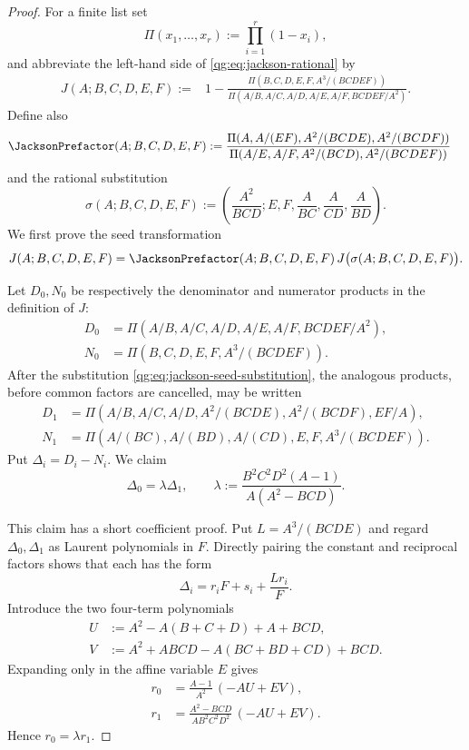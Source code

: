 \begin{proof}
For a finite list set
\[
 \Pi(x_1,\ldots,x_r):=\prod_{i=1}^{r}(1-x_i),
\]
and abbreviate the left-hand side of
\eqref{qg:eq:jackson-rational} by
\begin{align*}
J(A;B,C,D,E,F)
:={}&1-
\frac{\Pi(B,C,D,E,F,A^3/(BCDEF))}
{\Pi(A/B,A/C,A/D,A/E,A/F,BCDEF/A^2)}.
\end{align*}
Define also
\begin{align*}
\JacksonPrefactor(A;B,C,D,E,F)
:={}&
\frac{\Pi(A,A/(EF),A^2/(BCDE),A^2/(BCDF))}
{\Pi(A/E,A/F,A^2/(BCD),A^2/(BCDEF))}
\end{align*}
and the rational substitution
\begin{equation}
\label{qg:eq:jackson-seed-substitution}
\sigma(A;B,C,D,E,F)
:=\left(
 \frac{A^2}{BCD};
 E,F,\frac{A}{BC},\frac{A}{CD},\frac{A}{BD}
\right).
\end{equation}
We first prove the seed transformation
\begin{equation}
\label{qg:eq:jackson-seed}
 J(A;B,C,D,E,F)
 =\JacksonPrefactor(A;B,C,D,E,F)\,
  J\bigl(\sigma(A;B,C,D,E,F)\bigr).
\end{equation}

Let $D_0,N_0$ be respectively the denominator and numerator products in the
definition of $J$:
\begin{align*}
D_0&=\Pi(A/B,A/C,A/D,A/E,A/F,BCDEF/A^2),\\
N_0&=\Pi(B,C,D,E,F,A^3/(BCDEF)).
\end{align*}
After the substitution \eqref{qg:eq:jackson-seed-substitution}, the analogous
products, before common factors are cancelled, may be written
\begin{align*}
D_1&=\Pi(A/B,A/C,A/D,A^2/(BCDE),A^2/(BCDF),EF/A),\\
N_1&=\Pi(A/(BC),A/(BD),A/(CD),E,F,A^3/(BCDEF)).
\end{align*}
Put $\Delta_i=D_i-N_i$.  We claim
\begin{equation}
\label{qg:eq:jackson-delta-transform}
 \Delta_0=\lambda\Delta_1,
 \qquad
 \lambda:=\frac{B^2C^2D^2(A-1)}{A(A^2-BCD)}.
\end{equation}

This claim has a short coefficient proof.  Put $L=A^3/(BCDE)$ and regard
$\Delta_0,\Delta_1$ as Laurent polynomials in $F$.  Directly pairing the
constant and reciprocal factors shows that each has the form
\[
 \Delta_i=r_iF+s_i+\frac{Lr_i}{F}.
\]
Introduce the two four-term polynomials
\begin{align*}
U&:=A^2-A(B+C+D)+A+BCD,\\
V&:=A^2+ABCD-A(BC+BD+CD)+BCD.
\end{align*}
Expanding only in the affine variable $E$ gives
\begin{align*}
r_0&=\frac{A-1}{A^2}\,(-AU+EV),\\
r_1&=\frac{A^2-BCD}{AB^2C^2D^2}\,(-AU+EV).
\end{align*}
Hence $r_0=\lambda r_1$.


\end{proof}
